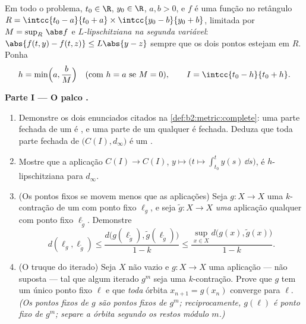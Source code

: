 \begin{problem}
\label{pb:b2:metric:1}
Em todo o problema, $t_0 \in \R$, $y_0 \in \R$, $a, b > 0$, e $f$ é uma
função  no retângulo $R = \intcc{t_0 - a}{t_0 +
a} \times \intcc{y_0 - b}{y_0 + b}$, limitada por $M =
\sup_R\,\abs f$ e \emph{$L$-lipschitziana na segunda variável}:
$\abs{f(t, y) - f(t, z)} \leq L\abs{y - z}$ sempre que os dois pontos
estejam em $R$. Ponha
\[
h = \min\Bigl(a, \frac bM\Bigr) \quad (\text{com } h = a
\text{ se } M = 0), \qquad I = \intcc{t_0 - h}{t_0 + h}.
\]

\medskip
\noindent\textbf{Parte I --- O palco .}
\begin{enumerate}
  \item Demonstre os dois enunciados citados na
        \cref{def:b2:metric:complete}: uma parte fechada de um
         é , e uma parte 
        de um  qualquer é fechada. Deduza que toda parte fechada
        de $\bigl(C(I), d_\infty\bigr)$ é um .
  \item Mostre que a aplicação $C(I) \to C(I)$, $y \mapsto \bigl(t
        \mapsto \int_{t_0}^{t}y(s)\,\dd s\bigr)$, é
        $h$-lipschitziana para $d_\infty$.
  \item (Os pontos fixos se movem menos que as aplicações) Seja $g \colon X
        \to X$ uma $k$-contração de um  com ponto
        fixo $\ell_g$, e seja $\widetilde g \colon X \to X$
        \emph{uma} aplicação qualquer com ponto fixo $\ell_{\widetilde g}$.
        Demonstre
        \[
        d(\ell_g, \ell_{\widetilde g}) \leq
        \frac{d\bigl(g(\ell_{\widetilde g}),
        \widetilde g(\ell_{\widetilde g})\bigr)}{1 - k}
        \leq \frac{\sup_{x \in X} d\bigl(g(x), \widetilde
        g(x)\bigr)}{1 - k}.
        \]
  \item (O truque do iterado) Seja $X$  não vazio e $g
        \colon X \to X$ uma aplicação --- não suposta  ---
        tal que algum iterado $g^m$ seja uma $k$-contração.
        Prove que $g$ tem um único ponto fixo $\ell$ e que
        \emph{toda} órbita $x_{n+1} = g(x_n)$ converge para
        $\ell$. \emph{(Os pontos fixos de $g$ são pontos fixos de
        $g^m$; reciprocamente, $g(\ell)$ é ponto fixo de $g^m$;
        separe a órbita segundo os restos módulo $m$.)}
\end{enumerate}


\end{problem}
